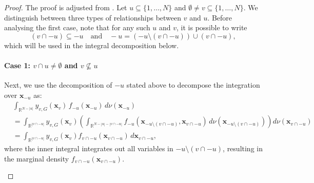 \begin{proof}
The proof is adjusted from \cite{rahman2014}. Let $u \subseteq \{1,\dots,N\}$ and $\emptyset \ne v \subseteq \{1,\dots,N\}$.
We distinguish between three types of relationships between $v$ and $u$.
Before analysing the first case, note that for any such $u$ and $v$, it is possible to write
\[
(v \cap -u) \subseteq -u \quad \text{and} \quad -u = (-u \setminus (v \cap -u)) \cup (v \cap -u),
\]
which will be used in the integral decomposition below.
\paragraph{Case 1: \( v \cap u \ne \emptyset \) and \( v \not\subseteq u \)}
Next, we use the decomposition of $-u$ stated above to decompose the integration over $\boldsymbol{x}_{-u}$ as:
\begin{equation*}
\begin{aligned}
&\int_{\mathbb{R}^{N - |u|}} 
    y_{v,G}(\boldsymbol{x}_v)\,
    f_{-u}(\boldsymbol{x}_{-u}) 
    \, d \nu(\boldsymbol{x}_{-u}) \\[3ex]
&= \int_{\mathbb{R}^{|v \cap -u|}} 
    y_{v,G}(\boldsymbol{x}_v)
    \left(
        \int_{\mathbb{R}^{N - |u| - |v \cap -u|}}
            f_{-u}(\boldsymbol{x}_{-u \setminus (v \cap -u)}, \boldsymbol{x}_{v \cap -u})
            \, d \nu(\boldsymbol{x}_{-u \setminus (v \cap -u)})
    \right) 
    d \nu(\boldsymbol{x}_{v \cap -u}) \\[3ex]
    &= \int_{\mathbb{R}^{|v \cap -u|}} y_{v,G}(\boldsymbol{x}_v) f_{v \cap -u}(\boldsymbol{x}_{v \cap -u}) \, d\boldsymbol{x}_{v \cap -u},
\end{aligned}
\end{equation*}
where the inner integral integrates out all variables in 
$-u \setminus (v \cap -u)$, 
resulting in the marginal density 
$f_{v \cap -u}(\boldsymbol{x}_{v \cap -u})$.
\begin{center}
\end{center}

\end{proof}
